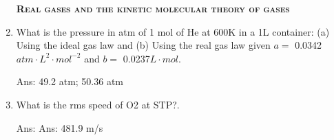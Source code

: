 \documentclass[main.tex]{subfiles}
\begin{document}
\begin{multicols*}{2}
\begin{enumerate}
{\raggedright\textsc{\textbf{Real gases and the kinetic molecular theory of gases }}\par}


\item What is the pressure in atm of 1 mol of He at 600K in a 1L container: (a) Using the ideal gas law and (b) Using the real gas law given $a=$ 0.0342$ atm\cdot L^2\cdot mol^{-2}$ and $b=$ 0.0237$L\cdot mol$.
\begin{flushright}\small Ans: 49.2 atm; 50.36 atm\end{flushright}



\item What is the rms speed of O2 at STP?.
\begin{flushright}\small Ans: Ans: 481.9 m/s\end{flushright}


\restoregeometry
\end{enumerate}
\end{multicols*}
\pagecolor{green!10}\afterpage{\nopagecolor}\newpage
\end{document}

